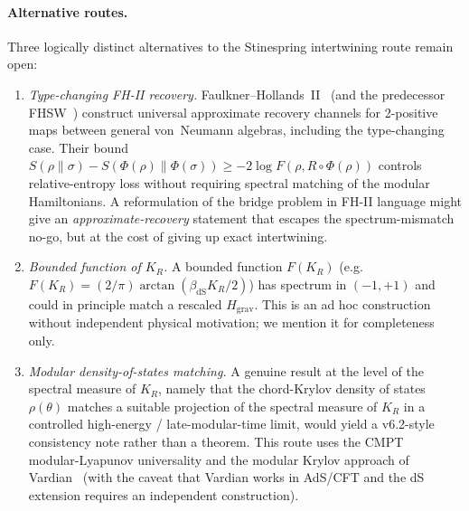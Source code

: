 \documentclass[12pt,a4paper]{article}
\theoremstyle{definition}
\begin{document}
\paragraph{Alternative routes.} Three logically distinct alternatives
to the Stinespring intertwining route remain open:

\begin{enumerate}
\item \emph{Type-changing FH-II recovery.}\;
Faulkner--Hollands~II~\cite{FaulknerHollandsII2020} (and the
predecessor FHSW~\cite{FHSW2020}) construct universal approximate
recovery channels for 2-positive maps between general von~Neumann
algebras, including the type-changing case. Their bound
$S(\rho\|\sigma) - S(\Phi(\rho)\|\Phi(\sigma)) \geq -2\log F(\rho,
R\circ\Phi(\rho))$ controls relative-entropy loss without requiring
spectral matching of the modular Hamiltonians. A reformulation of
the bridge problem in FH-II language might give an
\emph{approximate-recovery} statement that escapes the
spectrum-mismatch no-go, but at the cost of giving up exact intertwining.

\item \emph{Bounded function of $K_R$.}\;
A bounded function $F(K_R)$ (e.g.\ $F(K_R) = (2/\pi)\arctan
(\beta_{\mathrm{dS}} K_R/2)$) has spectrum in $(-1,+1)$ and could
in principle match a rescaled $H_{\mathrm{grav}}$. This is an ad hoc
construction without independent physical motivation; we mention it
for completeness only.

\item \emph{Modular density-of-states matching.}\;
A genuine result at the level of the spectral measure of $K_R$, namely
that the chord-Krylov density of states $\rho(\theta)$ matches a
suitable projection of the spectral measure of $K_R$ in a controlled
high-energy / late-modular-time limit, would yield a v6.2-style consistency
note rather than a theorem. This route uses the
CMPT~\cite{CMPT2023} modular-Lyapunov universality and the modular
Krylov approach of Vardian~\cite{Vardian2026} (with the caveat that
Vardian works in AdS/CFT and the dS extension requires an independent
construction).
\end{enumerate}
\end{document}
